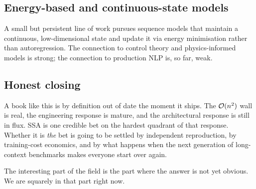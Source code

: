 \subsection{Energy-based and continuous-state models}

A small but persistent line of work pursues sequence models that maintain
a continuous, low-dimensional state and update it via energy
minimisation rather than autoregression. The connection to control
theory and physics-informed models is strong; the connection to
production NLP is, so far, weak.

\subsection{Honest closing}

A book like this is by definition out of date the moment it ships. The
$\mathcal{O}(n^2)$ wall is real, the engineering response is mature, and the
architectural response is still in flux. SSA is one credible bet on the
hardest quadrant of that response. Whether it is \emph{the} bet is going
to be settled by independent reproduction, by training-cost economics,
and by what happens when the next generation of long-context benchmarks
makes everyone start over again.

The interesting part of the field is the part where the answer is not yet
obvious. We are squarely in that part right now.

